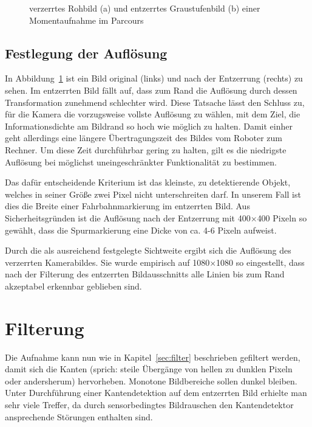 \begin{figure}[ht] %
  \centering
  \qquad
  \caption{verzerrtes Rohbild (a) und entzerrtes Graustufenbild (b) einer Momentaufnahme im Parcours}
\label{fig:bildvorverarbeitung_entzerren}
\end{figure} 

\subsection{Festlegung der Auflösung}
In Abbildung~\ref{fig:bildvorverarbeitung_entzerren} ist ein Bild original (links) und nach der Entzerrung (rechts) zu sehen. Im entzerrten Bild fällt auf, dass zum Rand die Auflösung durch dessen Transformation zunehmend schlechter wird. Diese Tatsache lässt den Schluss zu, für die Kamera die vorzugsweise vollste Auflösung zu wählen, mit dem Ziel, die Informationsdichte am Bildrand so hoch wie möglich zu halten. Damit einher geht allerdings eine längere Übertragungszeit des Bildes vom Roboter zum Rechner. Um diese Zeit durchführbar gering zu halten, gilt es die niedrigste Auflösung bei möglichst uneingeschränkter Funktionalität zu bestimmen. 

Das dafür entscheidende Kriterium ist das kleinste, zu detektierende Objekt, welches in seiner Größe zwei Pixel nicht unterschreiten darf. In unserem Fall ist dies die Breite einer Fahrbahnmarkierung im entzerrten Bild. Aus Sicherheitsgründen ist die Auflösung nach der Entzerrung mit 400\( \times \)400 Pixeln so gewählt, dass die Spurmarkierung eine Dicke von ca. 4-6 Pixeln aufweist. 

Durch die als ausreichend festgelegte Sichtweite ergibt sich die Auflösung des verzerrten Kamerabildes. Sie wurde empirisch auf 1080\( \times \)1080 so eingestellt, dass nach der Filterung des entzerrten Bildausschnitts alle Linien bis zum Rand akzeptabel erkennbar geblieben sind.

\section{Filterung}
\label{sec:bildvorverarbeitung:filterung}
Die Aufnahme kann nun wie in Kapitel~\ref{sec:filter} beschrieben gefiltert werden, damit sich die Kanten (sprich: steile Übergänge von hellen zu dunklen Pixeln oder andersherum) hervorheben. Monotone Bildbereiche sollen dunkel bleiben. Unter Durchführung einer Kantendetektion auf dem entzerrten Bild erhielte man sehr viele Treffer, da durch sensorbedingtes Bildrauschen den Kantendetektor ansprechende Störungen enthalten sind. 

